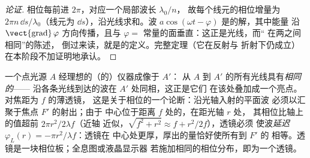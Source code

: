 \begin{proof}[论证]
相位每前进 $2\pi$，对应一个局部波长 $\lambda_0/n$，
故每个线元的相位增量为 $2\pi n\,\dd s/\lambda_0$（线元为 $\dd s$），沿光线求和。波
$a\cos(\omega t - \varphi)$ 是的解，其中能量
沿 $\operatorname{\vect{grad}}\varphi$ 方向传播，且与
$\varphi = $ 常量的面垂直：这正是光线，而“
在两之间相同”的陈述，
倒过来读，就是的定义。完整定理（它在反射与
折射下仍成立）在本阶段不加证明地承认。
\end{proof}

\begin{example}\label{ex:b2:scalar-light-model:lens}
一个点光源 $A$ 经理想的（的）仪器成像于 $A'$：
从 $A$ 到 $A'$ 的所有光线具有\emph{相同的}——
沿各条光线到达的波在 $A'$ 处同相，这正是它们
在该处叠加成一个亮点。对焦距为 $f$ 的薄透镜，
这是关于相位的一个论断：沿光轴入射的平面波
必须以汇聚于焦点 $F'$ 的射出；由于
中心位于距离 $f$ 处的，在距光轴 $r$ 处，
其相位比轴上的值超前 $2\pi r^2/2\lambda f$（近轴
近似，$\sqrt{f^2 + r^2} \approx f + r^2/2f$），透镜必须
使波\emph{延迟} $\varphi_L(r) = -\pi r^2/\lambda f$：透镜在
中心处更厚，厚出的量恰好使所有到 $F'$ 的
相等。透镜是一块相位板；全息图或液晶显示器
若施加相同的相位分布，即为一个透镜。
\end{example}

